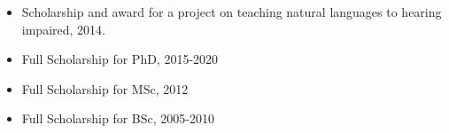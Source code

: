 
\begin{itemize}
    \item Scholarship and award for a project on teaching natural languages to hearing impaired, 2014.
    \item Full Scholarship for PhD, 2015-2020
    \item Full Scholarship for MSc, 2012 
    \item Full Scholarship for BSc, 2005-2010
\end{itemize}